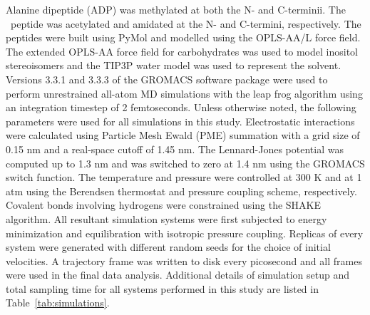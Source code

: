 	Alanine dipeptide (ADP) was methylated at both the N- and C-terminii. The \gafour\ peptide was acetylated and amidated at the N- and C-termini, respectively. The peptides were built using PyMol\cite{Anonymous:2012p58} and modelled using the OPLS-AA/L force field\cite{Jorgensen:1996p19}. The extended OPLS-AA force field for carbohydrates\cite{Damm:1997p36} was used to model inositol stereoisomers and the TIP3P water model\cite{Jorgensen:1983p40} was used to represent the solvent. Versions 3.3.1 and 3.3.3 of the GROMACS software package\cite{VanDerSpoel:2005p56} were used to perform unrestrained all-atom MD simulations with the leap frog algorithm using an integration timestep of 2 femtoseconds. Unless otherwise noted, the following parameters were used for all simulations in this study. Electrostatic interactions were calculated using Particle Mesh Ewald (PME) summation with a grid size of 0.15 nm and a real-space cutoff of 1.45 nm.\cite{Essmann:1995p51} The Lennard-Jones potential was computed up to 1.3 nm and was switched to zero at 1.4 nm using the GROMACS switch function. The temperature and pressure were controlled at 300 K and at 1 atm using the Berendsen thermostat and pressure coupling scheme, respectively.\cite{Berendsen:1984p26} Covalent bonds involving hydrogens were constrained using the SHAKE algorithm.\cite{Ryckaert:1977p30} All resultant simulation systems were first subjected to energy minimization and equilibration with isotropic pressure coupling. Replicas of every system were generated with different random seeds for the choice of initial velocities. A trajectory frame was written to disk every picosecond and all frames were used in the final data analysis. Additional details of simulation setup and total sampling time for all systems performed in this study are listed in Table~\ref{tab:simulations}.
	
